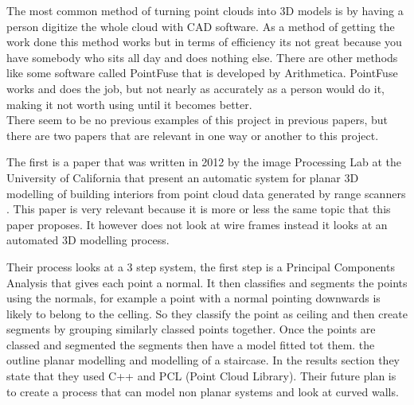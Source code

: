The most common method of turning point clouds into 3D models is by having a person digitize the whole cloud with CAD software. As a method of getting the work done this method works but in terms of efficiency its not great because you have somebody who sits all day and does nothing else. There are other methods like some software called PointFuse that is developed by Arithmetica. PointFuse works and does the job, but not nearly as accurately as a person would do it, making it not worth using until it becomes better.\\


There seem to be no previous examples of this project in previous papers, but there are two papers that are relevant in one way or another to this project.

The first is a paper that was written in 2012 by the image Processing Lab at the University of California that present an automatic system for planar 3D modelling of building interiors from point cloud data generated by range scanners \citep{sanchez_planar_2012}. This paper is very relevant because it is more or less the same topic that this paper proposes. It however does not look at wire frames instead it looks at an automated 3D modelling process.

Their process looks at a 3 step system, the first step is a Principal Components Analysis that gives each point a normal.
It then classifies and segments the points using the normals, for example a point with a normal pointing downwards is likely to belong to the celling. So they classify the point as ceiling and then create segments by grouping similarly classed points together.
Once the points are classed and segmented the segments then have a model fitted tot them. the outline planar modelling and modelling of a staircase. In the results section they state that they used C++ and PCL (Point Cloud Library). Their future plan is to create a process that can model non planar systems and look at curved walls.\\



